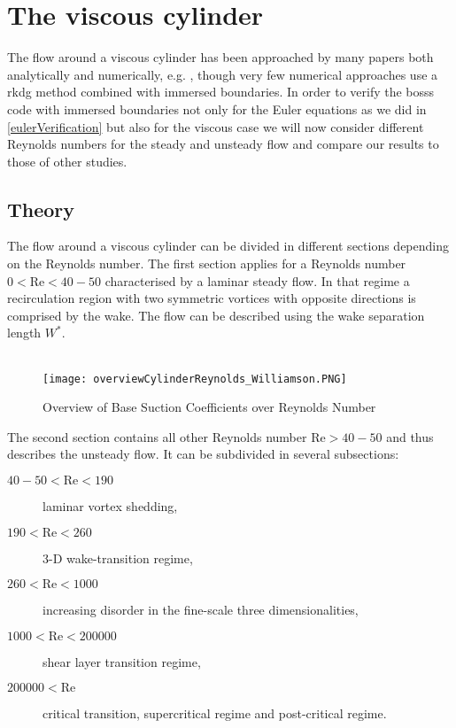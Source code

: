 \chapter{The viscous cylinder}
The flow around a viscous cylinder has been approached by many papers both analytically  and numerically, e.g. , though very few numerical approaches use a \gls{rkdg} method combined with immersed boundaries. In order to verify the \gls{bosss} code with immersed boundaries not only for the Euler equations as we did in \ref{eulerVerification} but also for the viscous case we will now consider different Reynolds numbers for the steady and unsteady flow and compare our results to those of other studies.

\section{Theory}
	The flow around a viscous cylinder can be divided in different sections depending on the Reynolds number. The first section applies for a Reynolds number $0 < \text{Re} < 40-50$ characterised by a laminar steady flow. In that regime a recirculation region with two symmetric vortices with opposite directions is comprised by the wake. The flow can be described using the wake separation length $W^*$.\\\\
	\begin{figure}[htp]
		\centering
		\texttt{[image: overviewCylinderReynolds\_Williamson.PNG]}
		\caption{Overview of Base Suction Coefficients over Reynolds Number }
		\label{fig:overview}
	\end{figure} 
	The second section contains all other Reynolds number $\text{Re}> 40-50$ and thus describes the unsteady flow. It can be subdivided in several subsections:
	\begin{description}
		\item[$40-50 < \text{Re} < 190$] laminar vortex shedding,
		\item[$190 < \text{Re} < 260$] 3-D wake-transition regime,
		\item[$260 < \text{Re} < 1000$] increasing disorder in the fine-scale three dimensionalities,
		\item[$1000 < \text{Re} < 200000$] shear layer transition regime,
		\item[$200000 < \text{Re}$] critical transition, supercritical regime and post-critical regime.
	\end{description}
	
